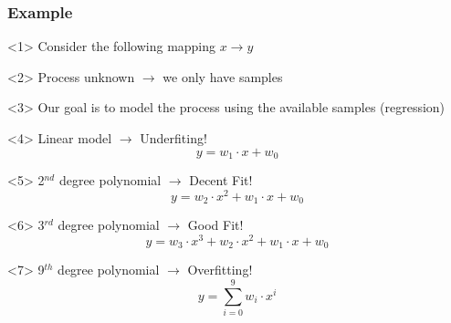 \begin{frame}
  \frametitle{Example}
  \begin{onlyenv}<1>
    Consider the following mapping $x \rightarrow y$
    \begin{center}
      \scalebox{0.5}{
        
      }
    \end{center}
  \end{onlyenv}
  \begin{onlyenv}<2>
    Process unknown \(\rightarrow\) we only have samples
    \begin{center}
      \scalebox{0.5}{
        
      }
    \end{center}
  \end{onlyenv}
  \begin{onlyenv}<3>
    Our goal is to model the process using the available samples (regression)
    \vspace{1cm}\\
  \end{onlyenv}
  \begin{onlyenv}<4>
    Linear model \(\rightarrow\) Underfiting!
    \begin{equation*}
      y = w_1\cdot x + w_0
    \end{equation*}
    \begin{center}
      \scalebox{0.5}{
        
      }
    \end{center}
  \end{onlyenv}
  \begin{onlyenv}<5>
    2$^{nd}$ degree polynomial \(\rightarrow\) Decent Fit!
    \begin{equation*}
      y = w_2\cdot x^2 + w_1\cdot x + w_0
    \end{equation*}
    \begin{center}
      \scalebox{0.5}{
        
      }
    \end{center}
  \end{onlyenv}
  \begin{onlyenv}<6>
    3$^{rd}$ degree polynomial \(\rightarrow\) Good Fit!
    \begin{equation*}
      y = w_3\cdot x^3 + w_2\cdot x^2 + w_1\cdot x + w_0
    \end{equation*}
    \begin{center}
      \scalebox{0.5}{
        
      }
    \end{center}
  \end{onlyenv}
  \begin{onlyenv}<7>
    9$^{th}$ degree polynomial \(\rightarrow\) Overfitting!
    \begin{equation*}
      y = \sum_{i=0}^{9}w_i\cdot x^{i}
    \end{equation*}
    \begin{center}
      \scalebox{0.5}{
        
      }
    \end{center}
  \end{onlyenv}
\end{frame}

